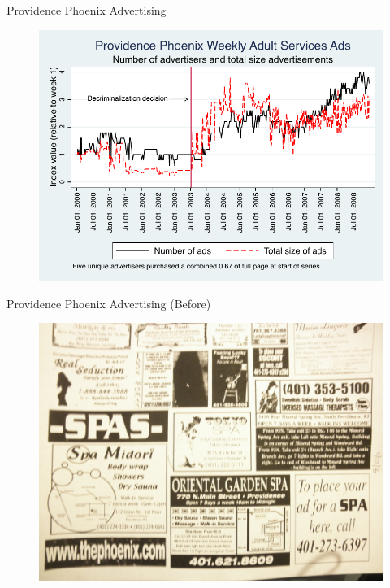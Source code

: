 \documentclass{beamer}
\begin{document}
\begin{frame}[shrink=20]{Providence Phoenix Advertising}
	\begin{figure}
	\includegraphics[totalheight=0.95 \textheight]{./lecture_includes/phx_ndx.pdf}
	\end{figure}
\end{frame}


\begin{frame}[shrink=20]{Providence Phoenix Advertising (Before)}
	\begin{figure}
	\includegraphics[totalheight=0.95 \textheight]{./lecture_includes/spa_jan03.jpg}
	\end{figure}
\end{frame}
\end{document}
